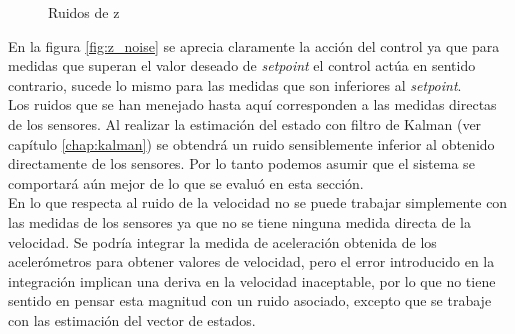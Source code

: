 \documentclass[main]{subfiles}
\begin{document}
\begin{figure}[h!]
  \centering
  \caption{Ruidos de z}
  \label{fig:ruidos_z}
\end{figure}

En la figura \ref{fig:z_noise} se aprecia claramente la acci\'on del control ya que para medidas que superan el valor deseado de \emph{setpoint} el control act\'ua en sentido contrario, sucede lo mismo para las medidas que son inferiores al \emph{setpoint}.\\

Los ruidos que se han menejado hasta aqu\'i corresponden a las medidas directas de los sensores. Al realizar la estimaci\'on del estado con filtro de Kalman (ver cap\'itulo \ref{chap:kalman}) se obtendr\'a un ruido sensiblemente inferior al obtenido directamente de los sensores. Por lo tanto podemos asumir que el sistema se comportar\'a a\'un mejor de lo que se evalu\'o en esta secci\'on.\\

En lo que respecta al ruido de la velocidad no se puede trabajar simplemente con las medidas de los sensores ya que no se tiene ninguna medida directa de la velocidad. Se podr\'ia integrar la medida de aceleraci\'on obtenida de los aceler\'ometros para obtener valores de velocidad, pero el error introducido en la integraci\'on implican una deriva en la velocidad inaceptable, por lo que no tiene sentido en pensar esta magnitud con un ruido asociado, excepto que se trabaje con las estimaci\'on del vector de estados.\\ 
\end{document}

